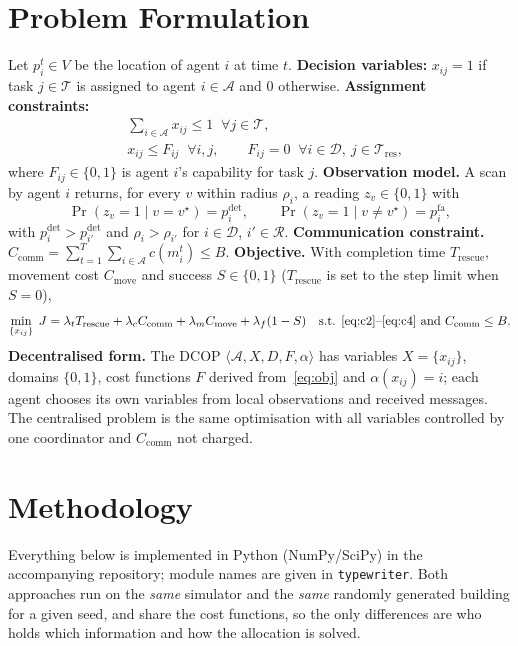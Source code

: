 \documentclass{article}
\newcommand{\A}{\mathscr{A}}
\newcommand{\D}{\mathscr{D}}
\newcommand{\R}{\mathscr{R}}
\newcommand{\T}{\mathscr{T}}
\newcommand{\Tres}{\mathscr{T}_{\mathrm{res}}}
\begin{document}
\section{Problem Formulation}\label{sec:formulation}
Let $p_i^t\in V$ be the location of agent $i$ at time $t$. \textbf{Decision variables:} $x_{ij}=1$ if task $j\in\T$ is
assigned to agent $i\in\A$ and $0$ otherwise. \textbf{Assignment constraints:}
\begin{align}
&\textstyle\sum_{i\in\A}x_{ij}\le 1 \;\;\forall j\in\T, \label{eq:c2}\\
&x_{ij}\le F_{ij}\;\;\forall i,j, \qquad F_{ij}=0\;\;\forall i\in\D,\ j\in\Tres, \label{eq:c4}
\end{align}
where $F_{ij}\in\{0,1\}$ is agent $i$'s capability for task $j$. \textbf{Observation model.} A scan by agent $i$ returns,
for every $v$ within radius $\rho_i$, a reading $z_v\in\{0,1\}$ with
\begin{equation}
\Pr(z_v=1\mid v=v^\star)=p^{\mathrm{det}}_i,\qquad \Pr(z_v=1\mid v\neq v^\star)=p^{\mathrm{fa}}_i,\label{eq:obs}
\end{equation}
with $p^{\mathrm{det}}_i>p^{\mathrm{det}}_{i'}$ and $\rho_i>\rho_{i'}$ for $i\in\D$, $i'\in\R$.
\textbf{Communication constraint.} $C_{\mathrm{comm}}=\sum_{t=1}^{T}\sum_{i\in\A}c(m_i^t)\le B$.
\textbf{Objective.} With completion time $T_{\mathrm{rescue}}$, movement cost $C_{\mathrm{move}}$ and success $S\in\{0,1\}$
($T_{\mathrm{rescue}}$ is set to the step limit when $S=0$),
\begin{equation}
\min_{\{x_{ij}\}}\; J=\lambda_tT_{\mathrm{rescue}}+\lambda_cC_{\mathrm{comm}}+\lambda_mC_{\mathrm{move}}+\lambda_f(1-S)
\quad\text{s.t. \eqref{eq:c2}--\eqref{eq:c4} and } C_{\mathrm{comm}}\le B.\label{eq:obj}
\end{equation}
\textbf{Decentralised form.} The DCOP $\langle\A,X,D,F,\alpha\rangle$ has variables $X=\{x_{ij}\}$, domains $\{0,1\}$, cost
functions $F$ derived from~\eqref{eq:obj} and $\alpha(x_{ij})=i$; each agent chooses its own variables from local
observations and received messages. The centralised problem is the same optimisation with all variables controlled
by one coordinator and $C_{\mathrm{comm}}$ not charged.

\section{Methodology}\label{sec:method}
Everything below is implemented in Python (NumPy/SciPy) in the accompanying repository; module names are given in
\texttt{typewriter}. Both approaches run on the \emph{same} simulator and the \emph{same} randomly generated building
for a given seed, and share the cost functions, so the only differences are who holds which information and how the
allocation is solved.
\end{document}
